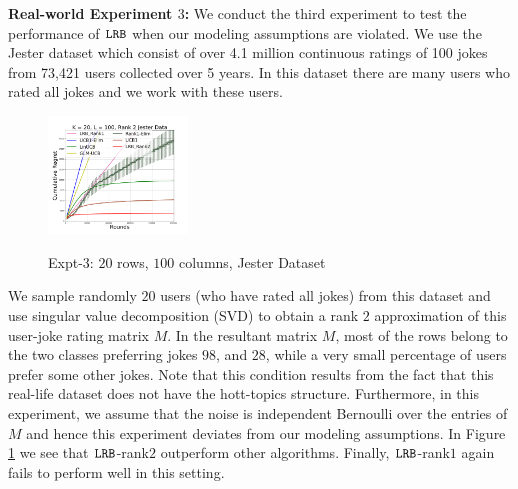 \textbf{Real-world Experiment $3$:} We conduct the third experiment to test the performance of ${\tt LRB}$ when our modeling assumptions are violated. We use the Jester dataset \citep{goldberg2001eigentaste} which consist of over 4.1 million continuous ratings of 100 jokes from 73,421 users collected over 5 years. In this dataset there are many users who rated all jokes and we work with these users. 
\begin{figure}
    {
            \includegraphics[trim={1cm 1cm 1cm 1cm},clip,width=3.7cm]{img/Figure_L4.png}
   }
 \caption{Expt-$3$: $20$ rows, $100$ columns, Jester Dataset}
 \label{fig:6}
 \vspace{-1.4em}
\end{figure}
We sample randomly $20$ users (who have rated all jokes) from this dataset and use singular value decomposition (SVD) to obtain a rank $2$ approximation of this user-joke rating matrix $M$. In the resultant matrix $M$, most of the rows belong to the two classes preferring jokes $98$, and $28$, while a very small percentage of users prefer some other jokes. Note that this condition results from the fact that this real-life dataset does not have the hott-topics structure. Furthermore, in this experiment, we assume that the noise is independent Bernoulli over the entries of $M$ and hence this experiment deviates from our modeling assumptions. In Figure \ref{fig:6} we see that ${\tt LRB}$-rank$2$ outperform other algorithms. Finally, ${\tt LRB}$-rank$1$ again fails to perform well in this setting.


